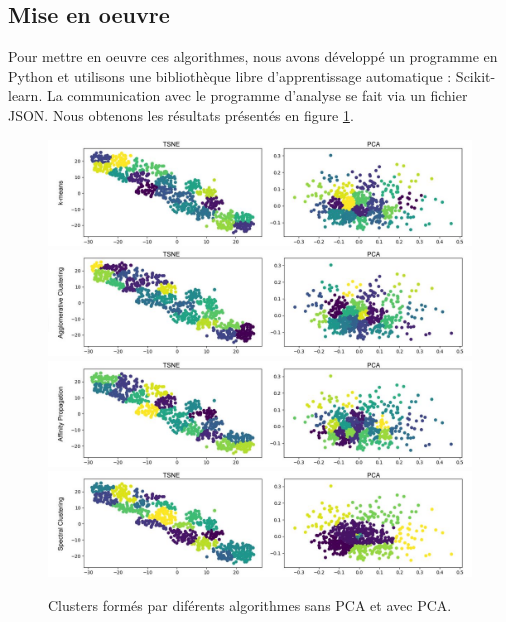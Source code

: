 \documentclass{ir}
\begin{document}
\subsection{Mise en oeuvre}
Pour mettre en oeuvre ces algorithmes, nous avons développé un programme en Python et utilisons une bibliothèque 
libre d’apprentissage automatique : Scikit-learn. La communication avec le programme d’analyse se fait via un 
fichier JSON. Nous obtenons les résultats présentés en figure \ref{clusters}.

\begin{figure}
        \centering
        \includegraphics[scale = 0.30]{images/cluster_kmean.jpg}
        \includegraphics[scale = 0.30]{images/cluster_agglo.jpg}
        \includegraphics[scale = 0.30]{images/cluster_affinity.jpg}
        \includegraphics[scale = 0.30]{images/cluster_spectral.jpg}
        \caption{Clusters formés par diférents algorithmes sans PCA et avec PCA.}
        \label{clusters}
\end{figure}
\end{document}
